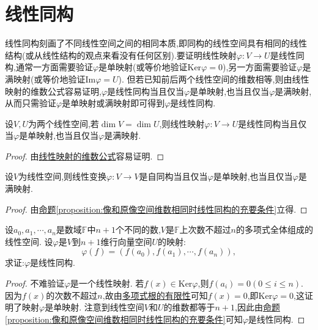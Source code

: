 \documentclass[../../main.tex]{subfiles}
\begin{document}
\section{线性同构}
线性同构刻画了不同线性空间之间的相同本质,即同构的线性空间具有相同的线性结构(或从线性结构的观点来看没有任何区别).要证明线性映射\(\varphi:V\to U\)是线性同构,通常一方面需要验证\(\varphi\)是单映射(或等价地验证\(\text{Ker}\varphi = 0\)),另一方面需要验证\(\varphi\)是满映射(或等价地验证\(\text{Im}\varphi = U\)). 但若已知前后两个线性空间的维数相等,则由线性映射的维数公式容易证明,\(\varphi\)是线性同构当且仅当\(\varphi\)是单映射,也当且仅当\(\varphi\)是满映射,从而只需验证\(\varphi\)是单映射或满映射即可得到\(\varphi\)是线性同构.

\begin{proposition}\label{proposition:像和原像空间维数相同时线性同构的充要条件}
设$V,U$为两个线性空间,若\(\dim V = \dim U\),则线性映射\(\varphi:V\rightarrow U\)是线性同构当且仅当\(\varphi\)是单映射,也当且仅当\(\varphi\)是满映射.
\end{proposition}
\begin{proof}
由\hyperref[proposition:值域和核空间维数之和等于原像空间维数]{线性映射的维数公式}容易证明.
\end{proof}

\begin{corollary}\label{corollary:线性变换自同构的充要条件}
设$V$为线性空间,则线性变换\(\varphi:V\rightarrow V\)是自同构当且仅当\(\varphi\)是单映射,也当且仅当\(\varphi\)是满映射.
\end{corollary}
\begin{proof}
由\hyperref[proposition:像和原像空间维数相同时线性同构的充要条件]{命题\ref{proposition:像和原像空间维数相同时线性同构的充要条件}}立得.
\end{proof}

\begin{lemma}\label{lemma:证明Lagrange插值公式}
设\(a_0,a_1,\cdots,a_n\)是数域\(\mathbb{F}\)中\(n + 1\)个不同的数,\(V\)是\(\mathbb{F}\)上次数不超过\(n\)的多项式全体组成的线性空间. 设\(\varphi\)是\(V\)到\(n + 1\)维行向量空间\(U\)的映射:
\[
\varphi(f)=(f(a_0),f(a_1),\cdots,f(a_n)),
\]
求证:\(\varphi\)是线性同构.
\end{lemma}
\begin{proof}
不难验证\(\varphi\)是一个线性映射. 若\(f(x)\in\text{Ker}\varphi\),则\(f(a_i)=0(0\leq i\leq n)\). 因为\(f(x)\)的次数不超过\(n\),故由\hyperref[proposition:多项式根的有限性]{多项式根的有限性}可知\(f(x)=0\),即\(\text{Ker}\varphi = 0\),这证明了映射\(\varphi\)是单映射. 注意到线性空间\(V\)和\(U\)的维数都等于\(n + 1\),因此由\hyperref[proposition:像和原像空间维数相同时线性同构的充要条件]{命题\ref{proposition:像和原像空间维数相同时线性同构的充要条件}}可知\(\varphi\)是线性同构.
\end{proof}
\end{document}
